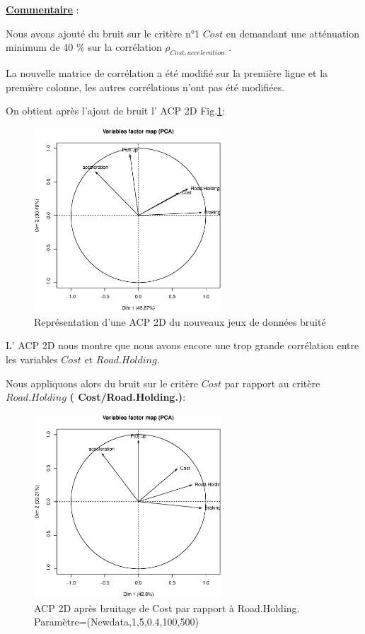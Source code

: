 \documentclass[a4paper]{article}
\begin{document}
\underline{\textbf{Commentaire}} :


Nous avons ajouté du bruit sur le critère n°1 $Cost$ en demandant une atténuation minimum de 40 \% sur la corrélation $\rho_{Cost,acceleration}$ . 

La nouvelle matrice de corrélation a été modifié sur la première ligne et la première colonne, les autres corrélations n'ont pas été modifiées.

On obtient après l'ajout de bruit  l' ACP 2D Fig.\ref{acpbruit}:

\begin{figure}[H] 
    \center 
    \includegraphics[width=7cm]{GRAP_THIERRY_FORT_BRUIT.eps} 
    \caption{Représentation d'une ACP 2D du nouveaux jeux de données bruité} 
\label{acpbruit}
\end{figure} 

 L' ACP 2D nous montre que nous avons encore une trop grande corrélation entre les variables  $Cost$ et $Road.Holding$.

Nous appliquons alors du bruit sur le critère $Cost$ par rapport au critère $Road.Holding$ \textbf{ ( Cost/Road.Holding.)}:
 
\begin{figure}[H] 
    \center 
    \includegraphics[width=7cm]{GRAPHE_THIERRY_FINAL_ACP.eps} 
    \caption{ACP 2D après bruitage de Cost par rapport à Road.Holding. Paramètre=(Newdata,1,5,0.4,100,500)} 
\end{figure} 
\end{document}
